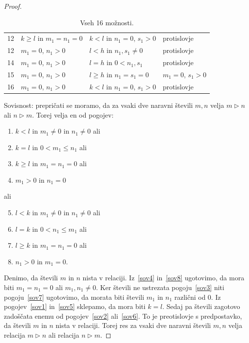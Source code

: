 \documentclass[mat2]{fmfdelo}
\begin{document}
\begin{proof}
\begin{table}[h!]
\begin{tabular}{||c | l | l | l||}
 12 & $k \geq l$ in $m_1 = n_1 = 0$ & $k<l$ in $n_1 = 0$, $s_1 > 0$ & protislovje \\
 12 & $m_1 = 0$, $n_1 > 0$ & $l<h$ in $n_1, s_1 \neq 0$ & protislovje \\ 
 14 & $m_1 = 0$, $n_1 > 0$ & $l=h$ in $0<n_1, s_1$ & protislovje \\
 15 & $m_1 = 0$, $n_1 > 0$ & $l \geq h$ in $n_1 = s_1 = 0$ & $m_1 = 0$, $s_1 > 0$ \\
 16 & $m_1 = 0$, $n_1 > 0$ & $k<l$ in $n_1 = 0$, $s_1 > 0$ & protislovje \\[1ex] 
 \hline
\end{tabular}
\caption{Vseh 16 možnosti.}
\label{table:1}
\end{table}

Sovisnost: prepričati se moramo, da za vsaki dve naravni števili $m, n$ velja $m \triangleright n$ ali $n \triangleright m$. Torej velja en od pogojev:
\begin{enumerate}[label={(\roman*)}]
\item $k<l$ in $m_1 \neq 0$ in $n_1 \neq 0$ ali \label{sov1}
\item $k=l$ in $0<m_1 \leq n_1$ ali \label{sov2}
\item $k \geq l$ in $m_1 = n_1=0$ ali \label{sov3}
\item $m_1>0$ in $n_1 =0$ \label{sov4}
\end{enumerate}
ali 
\begin{enumerate}[label={(\roman*)}]
\setcounter{enumi}{4}
\item $l<k$ in $m_1 \neq 0$ in $n_1 \neq 0$ ali \label{sov5}
\item $l=k$ in $0<n_1 \leq m_1$ ali \label{sov6}
\item $l \geq k$ in $m_1 = n_1=0$ ali \label{sov7}
\item $n_1>0$ in $m_1 =0$. \label{sov8}
\end{enumerate}
Denimo, da števili $m$ in $n$ nista v relaciji. Iz~\ref{sov4} in~\ref{sov8} ugotovimo, da mora biti $m_1 = n_1 = 0$ ali $m_1, n_1 \neq 0$. Ker števili ne ustrezata pogoju~\ref{sov3} niti pogoju~\ref{sov7} ugotovimo, da morata biti števili $m_1$ in $n_1$ različni od 0. Iz pogojev~\ref{sov1} in~\ref{sov5} sklepamo, da mora biti $k=l$. Sedaj pa števili zagotovo zadoščata enemu od pogojev~\ref{sov2} ali~\ref{sov6}. To je preotislovje s predpostavko, da števili $m$ in $n$ nista v relaciji. Torej res za vsaki dve naravni števili $m, n$ velja relacija $m \triangleright n$ ali relacija $n \triangleright m$. 
\end{proof}
\end{document}
